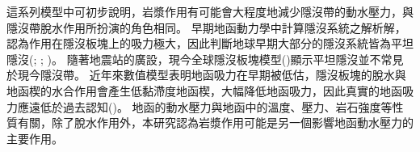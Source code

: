 這系列模型中可初步說明，岩漿作用有可能會大程度地減少隱沒帶的動水壓力，與隱沒帶脫水作用所扮演的角色相同。
早期地函動力學中計算隱沒系統之解析解，認為作用在隱沒板塊上的吸力極大，因此判斷地球早期大部分的隱沒系統皆為平坦隱沒(\citealp{tovish1978mantle}; \citealp{vlaar1983thermal}; \citealp{abbott1994flat})。
隨著地震站的廣設，現今全球隱沒板塊模型(\citealp{hayes2018slab2})顯示平坦隱沒並不常見於現今隱沒帶。
近年來數值模型表明地函吸力在早期被低估，隱沒板塊的脫水與地函楔的水合作用會產生低黏滯度地函楔，大幅降低地函吸力，因此真實的地函吸力應遠低於過去認知(\citealp{Manea2007})。
地函的動水壓力與地函中的溫度、壓力、岩石強度等性質有關，除了脫水作用外，本研究認為岩漿作用可能是另一個影響地函動水壓力的主要作用。



